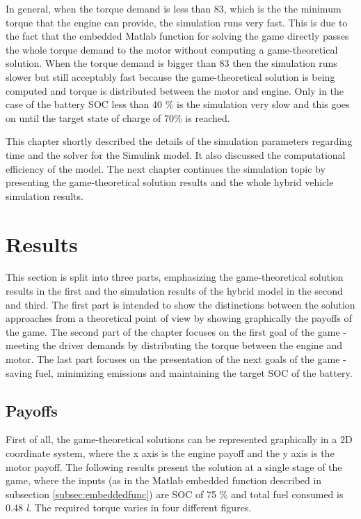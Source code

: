 In general, when the torque demand is less than 83, which is the the minimum torque that the engine can provide, the simulation runs very fast. This is due to the fact that the embedded Matlab function for solving the game directly passes the whole torque demand to the motor without computing a game-theoretical solution. When the torque demand is bigger than 83 then the simulation runs slower but still acceptably fast because the game-theoretical solution is being computed and torque is distributed between the motor and engine. Only in the case of the battery SOC less than 40 \% is the simulation very slow and this goes on until the target state of charge of 70\% is reached.

This chapter shortly described the details of the simulation parameters regarding time and the solver for the Simulink model. It also discussed the computational efficiency of the model. The next chapter continues the simulation topic by presenting the game-theoretical solution results and the whole hybrid vehicle simulation results.


\section{Results}
\label{sec:results}
This section is split into three parts, emphasizing the game-theoretical solution results in the first and the simulation results of the hybrid model in the second and third. The first part is intended to show the distinctions between the solution approaches from a theoretical point of view by showing graphically the payoffs of the game. The second part of the chapter focuses on the first goal of the game - meeting the driver demands by distributing the torque between the engine and motor. The last part focuses on the presentation of the next goals of the game - saving fuel, minimizing emissions and maintaining the target SOC of the battery.

\subsection{Payoffs}
First of all, the game-theoretical solutions can be represented graphically in a 2D coordinate system, where the x axis is the engine payoff and the y axis is the motor payoff. The following results present the solution at a single stage of the game, where the inputs (as in the Matlab embedded function described in subsection \ref{subsec:embeddedfunc}) are SOC of 75 \% and total fuel consumed is 0.48 \textit{l}. The required torque varies in four different figures. 

